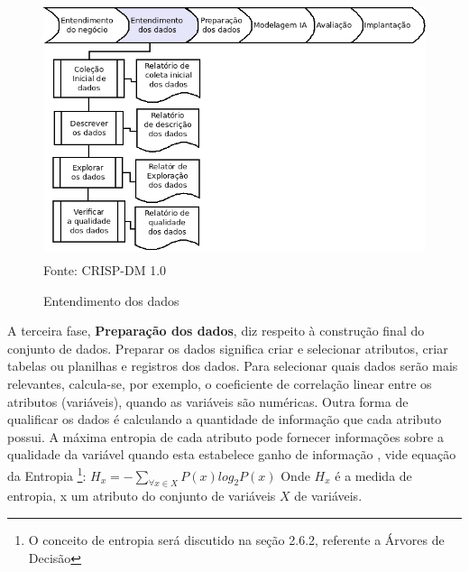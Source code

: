 \begin{figure}[!ht]
\centering
\caption{Entendimento dos dados}
\vspace{1mm}
\includegraphics[width=120mm, height=75mm]{Figuras/Cronograma/EntendDados.png}\\
\tiny Fonte: CRISP-DM 1.0
\end{figure}

\pagebreak


A terceira fase, \textbf{Preparação dos dados}, diz respeito à construção final do conjunto de dados. 
Preparar os dados significa criar e selecionar atributos, criar tabelas ou planilhas e registros dos dados.
Para selecionar quais dados serão mais relevantes, calcula-se, por exemplo, o coeficiente de correlação linear entre os atributos (variáveis), quando as variáveis são numéricas. Outra forma de qualificar os dados é calculando a quantidade de informação que cada atributo possui. A máxima entropia de cada atributo pode fornecer informações sobre a qualidade da variável quando esta estabelece ganho de informação \cite{NorvigRussel2004}, vide equação da Entropia \footnote{O conceito de entropia será discutido na seção 2.6.2, referente a Árvores de Decisão}: $ H_{x}=-\sum_{\forall x \in X}P(x)log_{2}P(x) $
Onde $ H_{x} $ é a medida de entropia, x um atributo do conjunto de variáveis $X$ de variáveis. 


